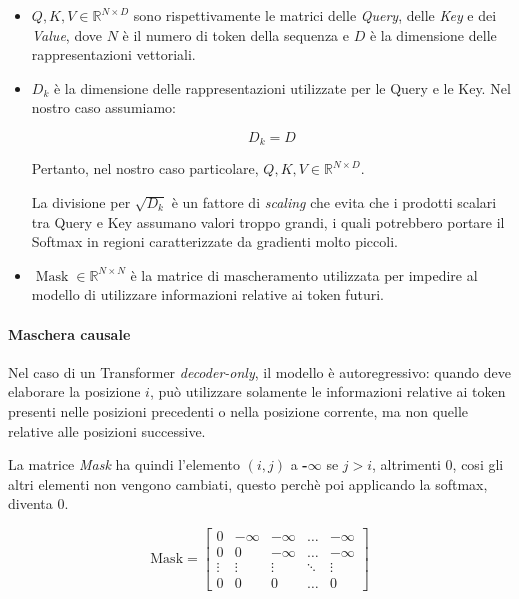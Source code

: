 \begin{itemize}

\item $Q,K,V \in \mathbb{R}^{N \times D}$ sono rispettivamente le matrici delle \textit{Query}, delle \textit{Key} e dei \textit{Value}, dove $N$ è il numero di token della sequenza e $D$ è la dimensione delle rappresentazioni vettoriali.

\item $D_k$ è la dimensione delle rappresentazioni utilizzate per le Query e le Key. Nel nostro caso assumiamo:

\begin{equation}
D_k = D
\end{equation}

Pertanto, nel nostro caso particolare, $Q,K,V\in\mathbb{R}^{N\times D}$.

La divisione per $\sqrt{D_k}$ è un fattore di \textit{scaling} che evita che i prodotti scalari tra Query e Key assumano valori troppo grandi, i quali potrebbero portare il Softmax in regioni caratterizzate da gradienti molto piccoli.

\item $\operatorname{Mask}\in\mathbb{R}^{N\times N}$ è la matrice di mascheramento utilizzata per impedire al modello di utilizzare informazioni relative ai token futuri.

\end{itemize}

\paragraph{Maschera causale}

Nel caso di un Transformer \textit{decoder-only}, il modello è autoregressivo: quando deve elaborare la posizione $i$, può utilizzare solamente le informazioni relative ai token presenti nelle posizioni precedenti o nella posizione corrente, ma non quelle relative alle posizioni successive.

La matrice \textit{Mask} ha quindi l'elemento $(i,j)$ a \textbf{-$\infty$} se $j > i$, altrimenti 0, cosi gli altri elementi non vengono cambiati, questo perchè poi applicando la softmax, diventa 0.

\begin{equation*}
\text{Mask} = 
\begin{bmatrix}
0 & -\infty & -\infty & \dots & -\infty \\
0 & 0 & -\infty & \dots & -\infty \\
\vdots & \vdots & \vdots & \ddots & \vdots \\
0 & 0 & 0 & \dots & 0
\end{bmatrix}
\end{equation*}

